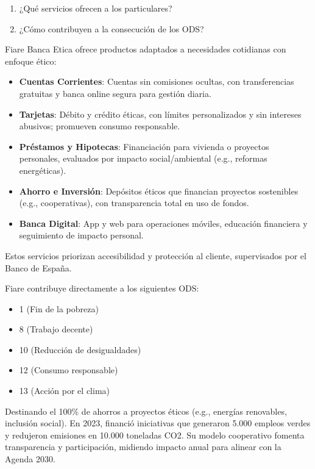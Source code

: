 \begin{enumerate}[label=\textbf{\alph*)}]
	\item ¿Qué servicios ofrecen a los particulares?
	\item ¿Cómo contribuyen a la consecución de los ODS?
\end{enumerate}


Fiare Banca Etica ofrece productos adaptados a necesidades cotidianas con enfoque ético:
\begin{itemize}
\item \textbf{Cuentas Corrientes}: Cuentas sin comisiones ocultas, con transferencias gratuitas y banca online segura para gestión diaria.
\item \textbf{Tarjetas}: Débito y crédito éticas, con límites personalizados y sin intereses abusivos; promueven consumo responsable.
\item \textbf{Préstamos y Hipotecas}: Financiación para vivienda o proyectos personales, evaluados por impacto social/ambiental (e.g., reformas energéticas).
\item \textbf{Ahorro e Inversión}: Depósitos éticos que financian proyectos sostenibles (e.g., cooperativas), con transparencia total en uso de fondos.
\item \textbf{Banca Digital}: App y web para operaciones móviles, educación financiera y seguimiento de impacto personal.
\end{itemize}
Estos servicios priorizan accesibilidad y protección al cliente, supervisados por el Banco de España.

Fiare contribuye directamente a los siguientes ODS:
\begin{itemize}
	\item  1 (Fin de la pobreza)
	\item 8 (Trabajo decente)
	\item 10 (Reducción de desigualdades) 
	\item 12 (Consumo responsable) 
	\item 13 (Acción por el clima)
\end{itemize}
Destinando el 100\% de ahorros a proyectos éticos (e.g., energías renovables, inclusión social). En 2023, financió iniciativas que generaron 5.000 empleos verdes y redujeron emisiones en 10.000 toneladas CO2. Su modelo cooperativo fomenta transparencia y participación, midiendo impacto anual para alinear con la Agenda 2030.






